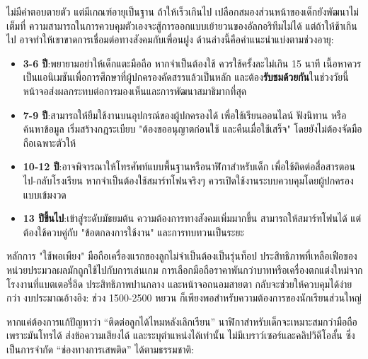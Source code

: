 


ไม่มีคำตอบตายตัว แต่มีเกณฑ์อายุเป็นฐาน ถ้าให้เร็วเกินไป เปลือกสมองส่วนหน้าของเด็กยังพัฒนาไม่เต็มที่ ความสามารถในการควบคุมตัวเองจะสู้การออกแบบเย้ายวนของอัลกอริทึมไม่ได้ แต่ถ้าให้ช้าเกินไป อาจทำให้เขาขาดการเชื่อมต่อทางสังคมกับเพื่อนฝูง ด้านล่างนี้คือคำแนะนำแบ่งตามช่วงอายุ:

\begin{itemize}
  \item \textbf{3-6 ปี}:พยายามอย่าให้เด็กแตะมือถือ หากจำเป็นต้องใช้ ควรใช้ครั้งละไม่เกิน 15 นาที เนื้อหาควรเป็นแอนิเมชันเพื่อการศึกษาที่ผู้ปกครองคัดสรรแล้วเป็นหลัก และต้อง\textbf{รับชมด้วยกัน}ในช่วงวัยนี้หน้าจอส่งผลกระทบต่อการมองเห็นและการพัฒนาสมาธิมากที่สุด
  \item \textbf{7-9 ปี}:สามารถให้ยืมใช้งานบนอุปกรณ์ของผู้ปกครองได้ เพื่อใช้เรียนออนไลน์ ฟังนิทาน หรือค้นหาข้อมูล เริ่มสร้างกฎระเบียบ "ต้องขออนุญาตก่อนใช้ และคืนเมื่อใช้เสร็จ" โดยยังไม่ต้องจัดมือถือเฉพาะตัวให้
  \item \textbf{10-12 ปี}:อาจพิจารณาให้โทรศัพท์แบบพื้นฐานหรือนาฬิกาสำหรับเด็ก เพื่อใช้ติดต่อสื่อสารตอนไป-กลับโรงเรียน หากจำเป็นต้องใช้สมาร์ทโฟนจริงๆ ควรเปิดใช้งานระบบควบคุมโดยผู้ปกครองแบบเข้มงวด
  \item \textbf{13 ปีขึ้นไป}:เข้าสู่ระดับมัธยมต้น ความต้องการทางสังคมเพิ่มมากขึ้น สามารถให้สมาร์ทโฟนได้ แต่ต้องใช้ควบคู่กับ "ข้อตกลงการใช้งาน" และการทบทวนเป็นระยะ
\end{itemize}

\begin{tcbinfo}{หลักการ "ใช้พอเพียง"}
มือถือเครื่องแรกของลูกไม่จำเป็นต้องเป็นรุ่นท็อป ประสิทธิภาพที่เหลือเฟือของหน่วยประมวลผลมักถูกใช้ไปกับการเล่นเกม การเลือกมือถือราคาพันกว่าบาทหรือเครื่องตกแต่งใหม่จากโรงงานที่แบตเตอรี่อึด ประสิทธิภาพปานกลาง และหน้าจอถนอมสายตา กลับจะช่วยให้ควบคุมได้ง่ายกว่า งบประมาณอ้างอิง: ช่วง 1500-2500 หยวน ก็เพียงพอสำหรับความต้องการของนักเรียนส่วนใหญ่

\end{tcbinfo}


หากแค่ต้องการแก้ปัญหาว่า “ติดต่อลูกได้ไหมหลังเลิกเรียน” นาฬิกาสำหรับเด็กจะเหมาะสมกว่ามือถือ เพราะมันโทรได้ ส่งข้อความเสียงได้ และระบุตำแหน่งได้เท่านั้น ไม่มีเบราว์เซอร์และคลิปวิดีโอสั้น ซึ่งเป็นการจำกัด “ช่องทางการเสพติด” ได้ตามธรรมชาติ:


